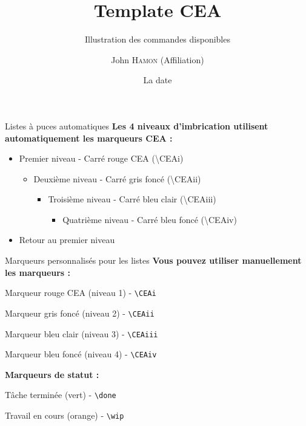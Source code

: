 \documentclass[10pt,aspectratio=169]{beamer}
\title{Template CEA}
\subtitle{Illustration des commandes disponibles}
\date[21/05/25]{La date}
\author[John Hamon]{John \textsc{Hamon} \footnotesize (Affiliation)}
\def\path{./fig}
\begin{document}
\begin{frame}[plain]
\begin{minipage}[c]{.55\linewidth}
\titlepage
\end{minipage}\hfill
\begin{minipage}[b]{.4\linewidth}
\end{minipage}
\end{frame}

\begin{frame}{Listes à puces automatiques}
\textbf{Les 4 niveaux d'imbrication utilisent automatiquement les marqueurs CEA :}
\begin{itemize}
    \item Premier niveau - Carré rouge CEA (\textbackslash CEAi)
    \begin{itemize}
        \item Deuxième niveau - Carré gris foncé (\textbackslash CEAii)
        \begin{itemize}
            \item Troisième niveau - Carré bleu clair (\textbackslash CEAiii)
            \begin{itemize}
                \item Quatrième niveau - Carré bleu foncé (\textbackslash CEAiv)
            \end{itemize}
        \end{itemize}
    \end{itemize}
    \item Retour au premier niveau
\end{itemize}
\end{frame}

\begin{frame}{Marqueurs personnalisés pour les listes}
\textbf{Vous pouvez utiliser manuellement les marqueurs :}
\vspace{0.5em}

\CEAi{} Marqueur rouge CEA (niveau 1) - \texttt{\textbackslash CEAi}

\CEAii{} Marqueur gris foncé (niveau 2) - \texttt{\textbackslash CEAii}

\CEAiii{} Marqueur bleu clair (niveau 3) - \texttt{\textbackslash CEAiii}

\CEAiv{} Marqueur bleu foncé (niveau 4) - \texttt{\textbackslash CEAiv}

\vspace{1em}
\textbf{Marqueurs de statut :}

\done{} Tâche terminée (vert) - \texttt{\textbackslash done}

\wip{} Travail en cours (orange) - \texttt{\textbackslash wip}
\end{frame}
\end{document}
